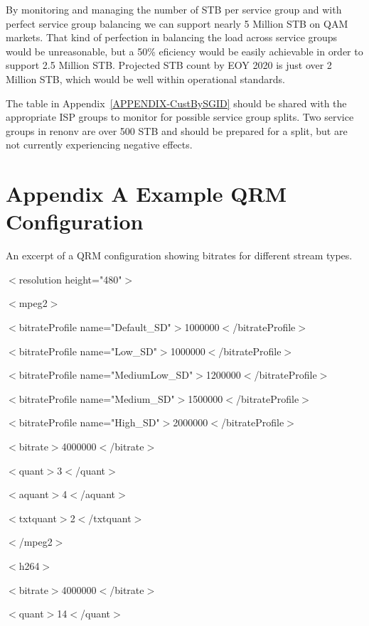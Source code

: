 \documentclass{article}
\begin{document}
By monitoring and managing the number of STB per service group and with perfect service group balancing we can support nearly 5 Million STB on QAM markets. That kind of perfection in balancing the load across service groups would be unreasonable, but a 50\% eficiency would be easily achievable in order to support 2.5 Million STB. Projected STB count by EOY 2020 is just over 2 Million STB, which would be well within operational standards. 

The table in Appendix~\ref{APPENDIX-CustBySGID} should be shared with the appropriate ISP groups to monitor for possible service group splits. Two service groups in renonv are over 500 STB and should be prepared for a split, but are not currently experiencing negative effects. 



\newpage

\appendix

\section{Appendix A\: Example QRM Configuration}
\label{APPENDIX-QRMConfig}

An excerpt of a QRM configuration showing bitrates for different stream types.  
\newline
\newline

$<$resolution height="480"$>$

$<$mpeg2$>$

$<$bitrateProfile name="Default\_SD"$>$1000000$<$/bitrateProfile$>$

$<$bitrateProfile name="Low\_SD"$>$1000000$<$/bitrateProfile$>$

$<$bitrateProfile name="MediumLow\_SD"$>$1200000$<$/bitrateProfile$>$

$<$bitrateProfile name="Medium\_SD"$>$1500000$<$/bitrateProfile$>$

$<$bitrateProfile name="High\_SD"$>$2000000$<$/bitrateProfile$>$

$<$bitrate$>$4000000$<$/bitrate$>$

$<$quant$>$3$<$/quant$>$

$<$aquant$>$4$<$/aquant$>$

$<$txtquant$>$2$<$/txtquant$>$

$<$/mpeg2$>$

$<$h264$>$

$<$bitrate$>$4000000$<$/bitrate$>$

$<$quant$>$14$<$/quant$>$
\end{document}
